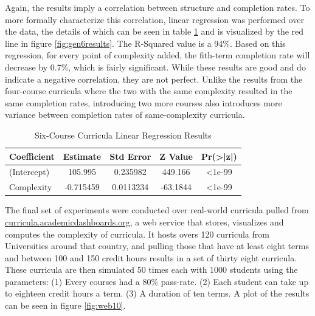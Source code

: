 \documentclass[botnum, fleqn]{unmeethesis}
\begin{document}
    Again, the results imply a correlation between structure and completion rates. To more formally characterize this correlation, linear regression was performed over the data, the details of which can be seen in table \ref{tab:gen6reg} and is visualized by the red line in figure \ref{fig:gen6results}. The R-Squared value is a 94\%. Based on this regression, for every point of complexity added, the fith-term completion rate will decrease by 0.7\%, which is fairly significant. While these results are good and do indicate a negative correlation, they are not perfect. Unlike the results from the four-course curricula where the two with the same complexity resulted in the same completion rates, introducing two more courses also introduces more variance between completion rates of same-complexity curricula.

    \begin{table}[!h]
      \centering
      \caption{Six-Course Curricula Linear Regression Results}
      \label{tab:gen6reg}
      \begin{tabular}{l*{4}{c}}
        Coefficient & Estimate  & Std Error & Z Value & Pr(>|z|) \\
        \hline
        (Intercept) & 105.995   & 0.235982  & 449.166 & <1e-99 \\
        Complexity  & -0.715459 & 0.0113234 & -63.1844 &  <1e-99  \\
      \end{tabular}
    \end{table}

    The final set of experiments were conducted over real-world curricula pulled from \href{http://curricula.academicdashboards.org}{curricula.academicdashboards.org}, a web service that stores, visualizes and computes the complexity of curricula. It hosts overs 120 curricula from Universities around that country, and pulling those that have at least eight terms and between 100 and 150 credit hours results in a set of thirty eight curricula. These curricula are then simulated 50 times each with 1000 students using the parameters: (1) Every courses had a 80\% pass-rate. (2) Each student can take up to eighteen credit hours a term. (3) A duration of ten terms. A plot of the results can be seen in figure \ref{fig:web10}.
\end{document}
